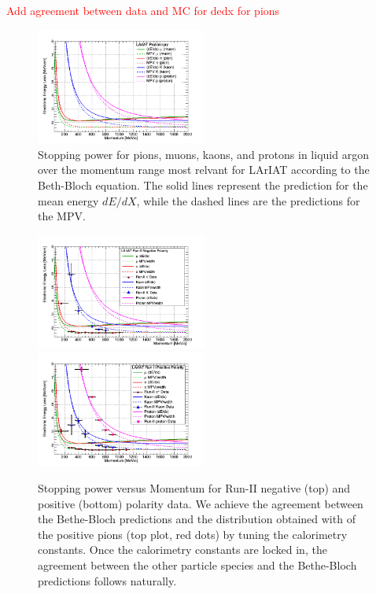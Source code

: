 \textcolor{red}{Add agreement between data and MC for dedx for pions}

\begin{figure}[htb]
\centering
\includegraphics[width=0.50\textwidth]{Chapter-5/Images/dEdXvsMomentumTemplate.png}
\caption{Stopping power for pions, muons, kaons, and protons in liquid argon over the momentum range most relvant for LArIAT according to the Beth-Bloch equation. The solid lines represent the prediction for the mean energy $dE/dX$, while the dashed lines are the predictions for the MPV.}
\label{fig:PDGEnergyLossArgon}
\end{figure}


\begin{figure}[htb]
\centering
\includegraphics[width=0.50\textwidth]{Chapter-5/Images/RunIINegTotaldEdXvsMomentum.png}
\includegraphics[width=0.50\textwidth]{Chapter-5/Images/RunIIPosTotaldEdXvsMomentum.png}
\caption{Stopping power versus Momentum for Run-II negative (top) and positive (bottom) polarity data. We achieve the agreement between the Bethe-Bloch predictions and the distribution obtained with of the positive pions (top plot, red dots) by tuning the calorimetry constants. Once the calorimetry constants are locked in, the agreement between the other particle species and the Bethe-Bloch predictions follows naturally.}
\label{fig:BBandData}
\end{figure}


